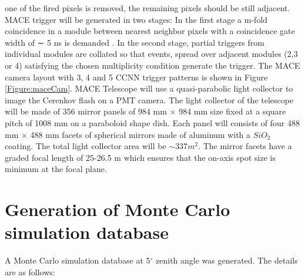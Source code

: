 \documentclass[preprint,12pt]{elsarticle}
\begin{document}
one of the fired pixels is removed, the remaining pixels should be still adjacent. MACE trigger will be generated in two stages: In the first stage a m-fold coincidence in a module between 
nearest neighbor pixels with a coincidence gate width of ∼ 5 ns is demanded . In the second stage, partial triggers from individual modules are collated so that events, spread
over adjacent modules (2,3 or 4) satisfying the chosen multiplicity condition generate the trigger.  %
The MACE camera layout with 3, 4 and 5 CCNN trigger patterns is shown in Figure \ref{Figure:maceCam}. MACE Telescope will 
use a quasi-parabolic light collector to image the Cerenkov flash on a PMT camera. The light collector of the telescope will be made of 356 mirror panels of 
984 mm $\times$ 984 mm size fixed at a square pitch of 1008 mm on a paraboloid shape  dish. Each panel will consists of four 488 mm $\times$ 488 mm facets of spherical 
mirrors made of aluminum with a $SiO_2$ coating. The total light collector area will be $\sim 337 m^2$. The mirror facets have a graded focal length of 25-26.5 m 
which ensures that the on-axis spot size is minimum at the focal plane.

\section{Generation of Monte Carlo simulation database}
\label{generation}
A Monte Carlo simulation database at 5$^\circ$ zenith angle was generated. The details are as follows:%
\end{document}
